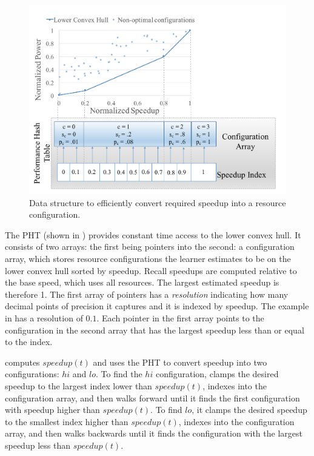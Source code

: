 \begin{figure}
\includegraphics[width=\columnwidth]{figures/performance-hash-table.pdf}
\caption{Data structure to efficiently convert required speedup into a
  resource configuration.}
  \label{fig:pht}
\end{figure}

The PHT (shown in ) provides constant time access to
the lower convex hull.  It consists of two arrays: the first being
pointers into the second: a configuration array, which stores resource
configurations the learner estimates to be on the lower convex hull
sorted by speedup.  Recall speedups are computed relative to the base
speed, which uses all resources.  The largest estimated speedup is
therefore 1.  The first array of pointers has a \emph{resolution}
indicating how many decimal points of precision it captures and it is
indexed by speedup.  The example in  has a resolution
of $0.1$.  Each pointer in the first array points to the configuration
in the second array that has the largest speedup less than or equal to
the index.

\SYSTEM{} computes $speedup(t)$ and uses the PHT to convert speedup
into two configurations: $hi$ and $lo$.  To find the $hi$
configuration, \SYSTEM{} clamps the desired speedup to the largest
index lower than $speedup(t)$, indexes into the configuration array,
and then walks forward until it finds the first configuration with
speedup higher than $speedup(t)$.  To find $lo$, it clamps the desired
speedup to the smallest index higher than $speedup(t)$, indexes into
the configuration array, and then walks backwards until it finds the
configuration with the largest speedup less than $speedup(t)$.

